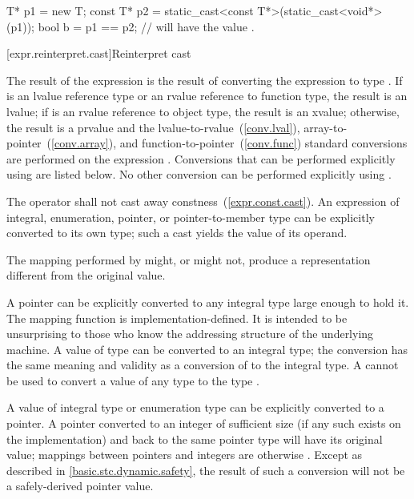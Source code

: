\begin{codeblock}
T* p1 = new T;
const T* p2 = static_cast<const T*>(static_cast<void*>(p1));
bool b = p1 == p2;  //  will have the value .
\end{codeblock}
\exitexample

[expr.reinterpret.cast]{Reinterpret cast}

\pnum
{}
%
The result of the expression  is the
result of converting the expression  to type .
%
%
If  is an lvalue reference type or an rvalue reference to function type, the result is an lvalue;
if  is an rvalue reference to object type, the result is an xvalue;
otherwise, the result is a prvalue and the
lvalue-to-rvalue~(\ref{conv.lval}), array-to-pointer~(\ref{conv.array}),
and function-to-pointer~(\ref{conv.func}) standard conversions are
performed on the expression . Conversions that can be performed explicitly
using  are listed below. No other conversion can
be performed explicitly using .

\pnum
The  operator shall not cast away constness~(\ref{expr.const.cast}).
An expression of integral, enumeration, pointer, or pointer-to-member type
can be explicitly converted to its own type; such a cast yields the value of
its operand.

\pnum
\enternote 
The mapping performed by  might, or might not, produce a
representation different from the original value.
\exitnote 

\pnum
{}%
%
A pointer can be explicitly converted to any integral type large enough
to hold it.
%
The mapping function is implementa\-tion-defined.
\enternote
It is intended to be unsurprising to those who know the addressing
structure of the underlying machine.
\exitnote A value of type  can be converted to an integral
type; the conversion has the same meaning and validity as a conversion of
 to the integral type. \enternote A 
cannot be used to convert a value of any type to the type
. \exitnote

\pnum
{}%
%
A value of integral type or enumeration type can be explicitly converted
to a pointer. A pointer converted to an integer of sufficient size (if
any such exists on the implementation) and back to the same pointer type
will have its original value;
%
mappings between pointers and integers are otherwise
.
\enternote Except as described in \ref{basic.stc.dynamic.safety}, the result of
such a conversion will not be a safely-derived pointer value. \exitnote

